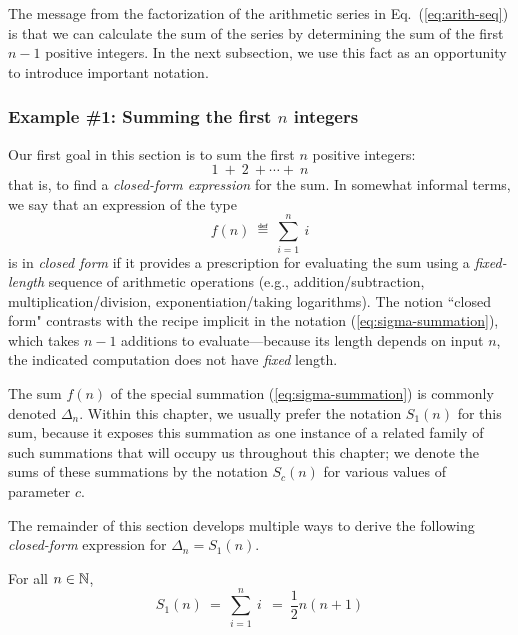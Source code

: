 \smallskip
 
The message from the factorization of the arithmetic series in Eq.~(\ref{eq:arith-seq}) is that we can calculate the sum of the series by determining the sum of the first $n-1$ positive integers.  In the next subsection, we use this fact as an opportunity to introduce important notation.

\subsubsection{Example \#1: Summing the first $n$ integers}
\label{sec:special-arithmetic-sums}

Our first goal in this section is to sum the first $n$ positive integers:
\[ 1 \ + \ 2 \ + \cdots + \ n \]
that is, to find a {\it closed-form expression} for the sum.  In somewhat informal terms, we say that an expression of the type
\begin{equation}
\label{eq:sigma-summation}
f(n) \ \eqdef \ \sum_{i=1}^n \ i
\end{equation}
is in {\it closed form} if it provides a prescription for evaluating the sum using a {\em fixed-length} sequence of arithmetic operations (e.g., addition/subtraction, multiplication/division, exponentiation/taking logarithms).  The notion ``closed form" contrasts with the recipe implicit in the notation (\ref{eq:sigma-summation}), which takes $n-1$ additions to evaluate---because its length depends on input $n$, the indicated computation does not have {\em fixed} length. 

The sum $f(n)$ of the special summation  (\ref{eq:sigma-summation}) is commonly denoted $\Delta_n$.  Within this chapter, we usually prefer the notation $S_1(n)$ for this sum, because it
exposes this summation as one instance of a related family of such summations that will occupy us throughout this chapter; we denote the sums of these summations by the notation $S_c(n)$ for various values of parameter $c$.

\smallskip

The remainder of this section develops multiple ways to derive the following {\em closed-form} expression for $\Delta_n = S_1(n)$.

\begin{prop}
\label{thm:sum-first-integers-Gauss}
For all $n \in \mathbb{N}$,
\begin{equation}
\label{eq:sum-1-to-n}
S_1(n) \ = \ \sum_{i=1}^n \ i \  \ = \  \frac{1}{2} n (n+1) 
\end{equation}
\end{prop}

